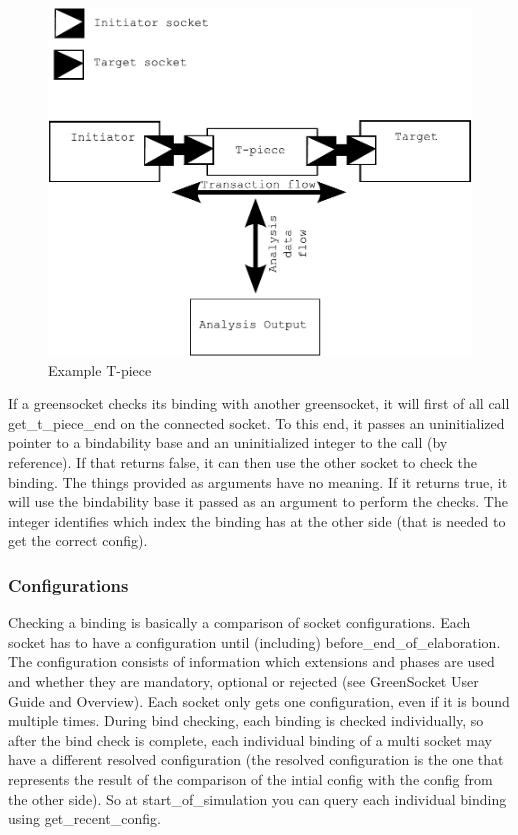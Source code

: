\documentclass[a4paper,10pt]{article}          %
\newcommand{\code}[1]{{\ttfamily#1}}
\begin{document}
\begin{figure}[htbp]
\begin{center}
\includegraphics[scale=0.7]{tpiece}
\caption{Example T-piece}
\label{fig:tpiece}
\end{center}
\end{figure}

If a greensocket checks its binding with another greensocket, it will first of all call \code{get\_t\_piece\_end} on the connected socket. To this end, it passes an uninitialized pointer to a bindability base and an uninitialized integer to the call (by reference).
If that returns false, it can then use the other socket to check the binding. The things provided as arguments have no meaning. If it returns true, it will use the bindability base it passed as an argument to perform the checks. The integer identifies which index the binding has at the other side (that is needed to get the correct config).

\subsubsection{Configurations}

Checking a binding is basically a comparison of socket configurations. Each socket has to have a configuration until (including) \code{before\_end\_of\_elaboration}. The configuration consists of information which extensions and phases are used and whether they are mandatory, optional or rejected (see GreenSocket User Guide and Overview). Each socket only gets one configuration, even if it is bound multiple times. During bind checking, each binding is checked individually, so after the bind check is complete, each individual binding of a multi socket may have a different resolved configuration (the resolved configuration is the one that represents the result of the comparison of the intial config with the config from the other side). So at \code{start\_of\_simulation} you can query each individual binding using \code{get\_recent\_config}.
\end{document}

